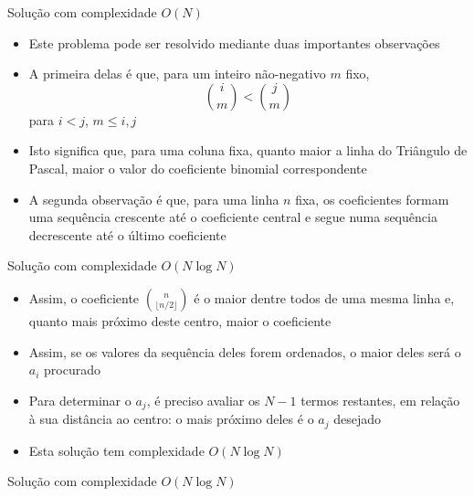 \begin{frame}[fragile]{Solução com complexidade $O(N)$}

    \begin{itemize}
        \item Este problema pode ser resolvido mediante duas importantes observações

        \item A primeira delas é que, para um inteiro não-negativo $m$ fixo,
        $$
            \binom{i}{m} < \binom{j}{m}
        $$
        para $i < j$, $m \leq i, j$

        \item Isto significa que, para uma coluna fixa, quanto maior a linha do Triângulo de
            Pascal, maior o valor do coeficiente binomial correspondente

        \item A segunda observação é que, para uma linha $n$ fixa, os coeficientes formam uma
            sequência crescente até o coeficiente central e segue numa sequência decrescente
            até o último coeficiente
    \end{itemize}

\end{frame}

\begin{frame}[fragile]{Solução com complexidade $O(N\log N)$}

    \begin{itemize}
        \item Assim, o coeficiente $\binom{n}{\lfloor n/2\rfloor}$ é o maior dentre todos de uma
            mesma linha e, quanto mais próximo deste centro, maior o coeficiente

        \item Assim, se os valores da sequência deles forem ordenados, o maior deles será o $a_i$
            procurado

        \item Para determinar o $a_j$, é preciso avaliar os $N - 1$ termos restantes, em relação
            à sua distância ao centro: o mais próximo deles é o $a_j$ desejado

        \item Esta solução tem complexidade $O(N\log N)$
    \end{itemize}

\end{frame}

\begin{frame}[fragile]{Solução com complexidade $O(N\log N)$}
\end{frame}
